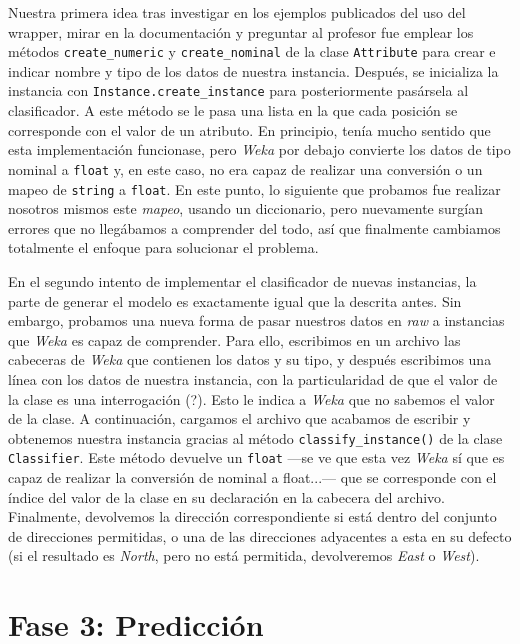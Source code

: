 \documentclass[12pt]{article}
\begin{document}
Nuestra primera idea tras investigar en los ejemplos publicados del uso del wrapper, mirar en la documentación y preguntar al profesor fue emplear los métodos \texttt{create\_numeric} y \texttt{create\_nominal} de la clase \texttt{Attribute} para crear e indicar nombre y tipo de los datos de nuestra instancia. Después, se inicializa la instancia con \texttt{Instance.create\_instance} para posteriormente pasársela al clasificador. A este método se le pasa una lista en la que cada posición se corresponde con el valor de un atributo. En principio, tenía mucho sentido que esta implementación funcionase, pero \emph{Weka} por debajo convierte los datos de tipo nominal a \texttt{float} y, en este caso, no era capaz de realizar una conversión o un mapeo de \texttt{string} a \texttt{float}. En este punto, lo siguiente que probamos fue realizar nosotros mismos este \emph{mapeo}, usando un diccionario, pero nuevamente surgían errores que no llegábamos a comprender del todo, así que finalmente cambiamos totalmente el enfoque para solucionar el problema.

\vspace{0.5cm}

En el segundo intento de implementar el clasificador de nuevas instancias, la parte de generar el modelo es exactamente igual que la descrita antes. Sin embargo, probamos una nueva forma de pasar nuestros datos en \emph{raw} a instancias que \emph{Weka} es capaz de comprender. Para ello, escribimos en un archivo las cabeceras de \emph{Weka} que contienen los datos y su tipo, y después escribimos una línea con los datos de nuestra instancia, con la particularidad de que el valor de la clase es una interrogación (?). Esto le indica a \emph{Weka} que no sabemos el valor de la clase. A continuación, cargamos el archivo que acabamos de escribir y obtenemos nuestra instancia gracias al método \texttt{classify\_instance()} de la clase \texttt{Classifier}. Este método devuelve un \texttt{float} ---se ve que esta vez \emph{Weka} sí que es capaz de realizar la conversión de nominal a float...--- que se corresponde con el índice del valor de la clase en su declaración en la cabecera del archivo. Finalmente, devolvemos la dirección correspondiente si está dentro del conjunto de direcciones permitidas, o una de las direcciones adyacentes a esta en su defecto (si el resultado es \emph{North}, pero no está permitida, devolveremos \emph{East} o \emph{West}).

\newpage
\section{Fase 3: Predicción}
\end{document}
